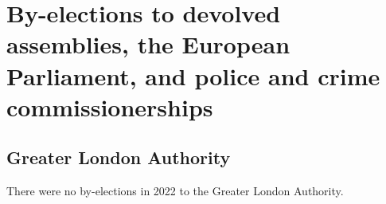 \documentclass[a4paper,openany]{book}
\begin{document}
%
%
%

\chapter{By-elections to devolved assemblies, the European Parliament, and police and crime commissionerships}

\section{Greater London Authority}

There were no by-elections in 2022 to the Greater London Authority.

\end{document}
